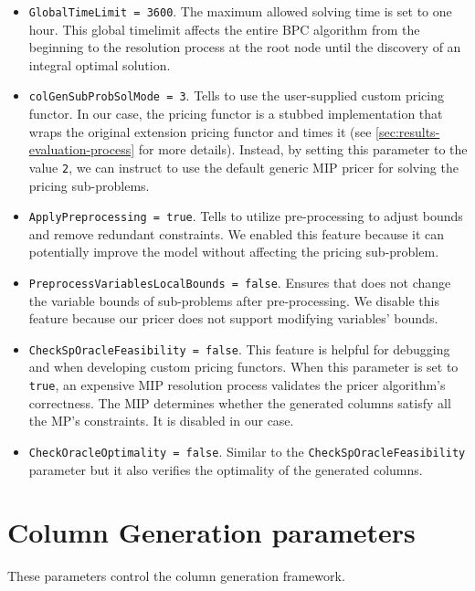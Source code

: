 \begin{itemize}
	\item \texttt{GlobalTimeLimit = 3600}.
	      The maximum allowed solving time is set to one hour.
	      This global timelimit affects the entire BPC algorithm
	      from the beginning to the resolution process at the root node
	      until the discovery of an integral optimal solution.
	\item \texttt{colGenSubProbSolMode = 3}.
	      Tells \bapcod{} to use the user-supplied custom pricing functor.
	      In our case, the pricing functor is a stubbed implementation that wraps
	      the original \vrpsolver{} extension pricing functor
	      and times it
	      (see \cref{sec:results-evaluation-process} for more details).
	      Instead, by setting this parameter to the value \texttt{2},
	      we can instruct \bapcod{} to use the default generic MIP pricer for solving the pricing sub-problems.
	\item \texttt{ApplyPreprocessing = true}.
	      Tells \bapcod{} to utilize pre-processing to adjust bounds and remove redundant constraints.
	      We enabled this feature because it can potentially improve the model
	      without affecting the pricing sub-problem.
	\item \texttt{PreprocessVariablesLocalBounds = false}.
	      Ensures that \bapcod{} does not change the variable bounds of sub-problems after pre-processing.
	      We disable this feature because our pricer does not support modifying variables' bounds.
	\item \texttt{CheckSpOracleFeasibility = false}.
	      This feature is helpful for debugging and when developing custom pricing functors.
	      When this parameter is set to \texttt{true},
	      an expensive MIP resolution process validates the pricer algorithm's correctness.
	      The MIP determines whether the generated columns satisfy all the MP's constraints.
	      It is disabled in our case.
	\item \texttt{CheckOracleOptimality = false}.
	      Similar to the \texttt{CheckSpOracleFeasibility} parameter but it also verifies the optimality of the generated columns.
\end{itemize}

\section{Column Generation parameters}

These parameters control the column generation framework.

